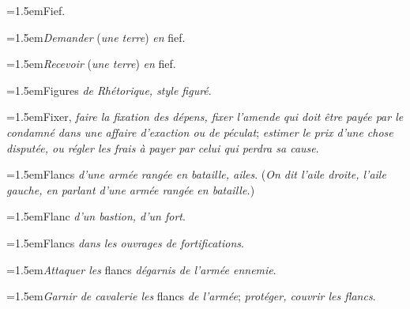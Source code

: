 \par{\dictfontsize\hangindent=1.5em\noindent Fief. \par}
\par{\dictfontsize\hangindent=1.5em\noindent \textit{Demander} (\textit{une terre}) \textit{en} fief. \par}
\par{\dictfontsize\hangindent=1.5em\noindent \textit{Recevoir} (\textit{une terre}) \textit{en} fief. \par}
\par{\dictfontsize\hangindent=1.5em\noindent Figures \textit{de Rhétorique, style figuré}. \par}
\par{\dictfontsize\hangindent=1.5em\noindent Fixer, \textit{faire la fixation des dépens, fixer l’amende qui doit être payée par le condamné dans une affaire d’exaction ou de péculat}; \textit{estimer le prix d’une chose disputée, ou régler les frais à payer par celui qui perdra sa cause}. \par}
\par{\dictfontsize\hangindent=1.5em\noindent Flancs \textit{d’une armée rangée en bataille, ailes}. (\textit{On dit l’aile droite, l’aile gauche, en parlant d’une armée rangée en bataille.}) \par}
\par{\dictfontsize\hangindent=1.5em\noindent Flanc \textit{d’un bastion, d’un fort}. \par}
\par{\dictfontsize\hangindent=1.5em\noindent Flancs \textit{dans les ouvrages de fortifications}. \par}
\par{\dictfontsize\hangindent=1.5em\noindent \textit{Attaquer les} flancs \textit{dégarnis de l’armée ennemie}. \par}
\par{\dictfontsize\hangindent=1.5em\noindent \textit{Garnir de cavalerie les} flancs \textit{de l’armée}; \textit{protéger, couvrir les flancs}. \par}
